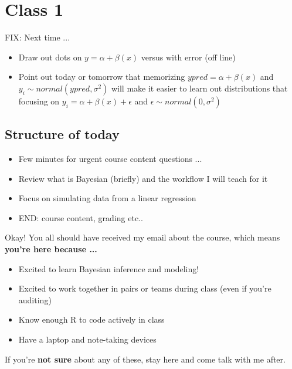 \documentclass[11pt]{article}
\begin{document}

\renewcommand{\refname}{\CHead{}}

\section{Class 1}  %

FIX: Next time ... 
\begin{itemize}
\item Draw out dots on $y=\alpha + \beta (x)$ versus with error (off line)
\item Point out today or tomorrow that memorizing $ypred=\alpha + \beta (x)$ and $y_i \sim normal(ypred, \sigma^2)$ will make it easier to learn out distributions that focusing on $y_i=\alpha + \beta (x) + \epsilon$ and $\epsilon \sim normal(0, \sigma^2)$ 
\end{itemize}

\subsection{Structure of today}
\begin{itemize}
\item Few minutes for urgent course content questions ... 
\item Review what is Bayesian (briefly) and the workflow I will teach for it
\item Focus on simulating data from a linear regression
\item END: course content, grading etc..
\end{itemize}
Okay! You all should have received my email about the course, which means\\ {\bf you're here because ... }
\begin{itemize}
\item Excited to learn Bayesian inference and modeling!
\item Excited to work together in pairs or teams during class (even if you're auditing)
\item Know enough R to code actively in class 
\item Have a laptop and note-taking devices
\end{itemize}
If you're {\bf not sure} about any of these, stay here and come talk with me after. 
\end{document}

